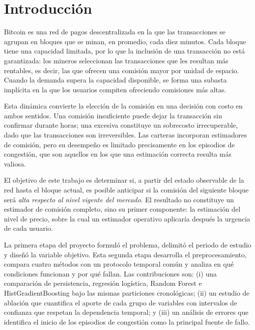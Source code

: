 \documentclass[conference]{IEEEtran}
\begin{document}
\section{Introducción}
Bitcoin es una red de pagos descentralizada en la que las transacciones se agrupan en bloques que se minan, en promedio, cada diez minutos. Cada bloque tiene una capacidad limitada, por lo que la inclusión de una transacción no está garantizada: los mineros seleccionan las transacciones que les resultan más rentables, es decir, las que ofrecen una comisión mayor por unidad de espacio. Cuando la demanda supera la capacidad disponible, se forma una subasta implícita en la que los usuarios compiten ofreciendo comisiones más altas.

Esta dinámica convierte la elección de la comisión en una decisión con costo en ambos sentidos. Una comisión insuficiente puede dejar la transacción sin confirmar durante horas; una excesiva constituye un sobrecosto irrecuperable, dado que las transacciones son irreversibles. Las carteras incorporan estimadores de comisión, pero su desempeño es limitado precisamente en los episodios de congestión, que son aquellos en los que una estimación correcta resulta más valiosa.

El objetivo de este trabajo es determinar si, a partir del estado observable de la red hasta el bloque actual, es posible anticipar si la comisión del siguiente bloque será \emph{alta respecto al nivel vigente del mercado}. El resultado no constituye un estimador de comisión completo, sino su primer componente: la estimación del nivel de precio, sobre la cual un estimador operativo aplicaría después la urgencia de cada usuario.

La primera etapa del proyecto formuló el problema, delimitó el periodo de estudio y diseñó la variable objetivo. Esta segunda etapa desarrolla el preprocesamiento, compara cuatro métodos con un protocolo temporal común y analiza en qué condiciones funcionan y por qué fallan. Las contribuciones son: (i) una comparación de persistencia, regresión logística, Random Forest e HistGradientBoosting bajo las mismas particiones cronológicas; (ii) un estudio de ablación que cuantifica el aporte de cada grupo de variables con intervalos de confianza que respetan la dependencia temporal; y (iii) un análisis de errores que identifica el inicio de los episodios de congestión como la principal fuente de fallo.

\end{document}
